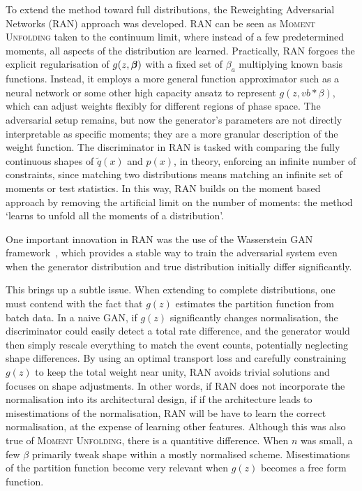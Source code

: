 {{        To extend the method toward full distributions, the Reweighting Adversarial Networks (RAN) approach was developed.
        RAN can be seen as \textsc{Moment Unfolding} taken to the continuum limit, where instead of a few predetermined moments, all aspects of the distribution are learned.
        Practically, RAN forgoes the explicit regularisation of $g(z, \vb*\beta)$ with a fixed set of $\beta_a$ multiplying known basis functions.
        Instead, it employs a more general function approximator such as a neural network or some other high capacity ansatz to represent $g(z, vb*\beta)$, which can adjust weights flexibly for different regions of phase space.
        The adversarial setup remains, but now the generator’s parameters are not directly interpretable as specific moments;
        they are a more granular description of the weight function.
        The discriminator in RAN is tasked with comparing the fully continuous shapes of $\tilde{q}(x)$ and $p(x)$, in theory, enforcing an infinite number of constraints, since matching two distributions means matching an infinite set of moments or test statistics.
        In this way, RAN builds on the moment based approach by removing the artificial limit on the number of moments: the method `learns to unfold all the moments of a distribution'.

        One important innovation in RAN was the use of the Wasserstein GAN framework~\cite{stephanovitch_optimal_2023}, which provides a stable way to train the adversarial system even when the generator distribution and true distribution initially differ significantly.

        This brings up a subtle issue.
        When extending to complete distributions, one must contend with the fact that $g(z)$ estimates the partition function from batch data.
        In a naive GAN, if $g(z)$ significantly changes normalisation, the discriminator could easily detect a total rate difference, and the generator would then simply rescale everything to match the event counts, potentially neglecting shape differences.
        By using an optimal transport loss and carefully constraining $g(z)$ to keep the total weight near unity, RAN avoids trivial solutions and focuses on shape adjustments.
        In other words, if RAN does not incorporate the normalisation into its architectural design, if if the architecture leads to misestimations of the normalisation, RAN will be have to learn the correct normalisation, at the expense of learning other features. 
        Although this was also true of \textsc{Moment Unfolding}, there is a quantitive difference.
        When $n$ was small, a few $\beta$ primarily tweak shape within a mostly normalised scheme.
        Misestimations of the partition function become very relevant when $g(z)$ becomes a free form function.

}}
